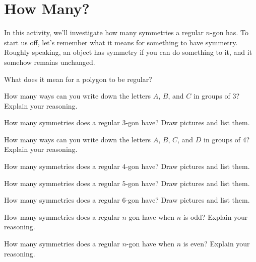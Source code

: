 \newpage
\section{How Many?} 
                                  

In this activity, we'll investigate how many symmetries a regular
$n$-gon has.  To start us off, let's remember what it means for
something to have symmetry. Roughly speaking, an object has symmetry
if you can do something to it, and it somehow remains unchanged.

\begin{prob}
What does it mean for a polygon to be regular?
\end{prob}

\begin{prob}
How many ways can you write down the letters $A$, $B$, and $C$ in
groups of 3? Explain your reasoning.
\end{prob}

\begin{prob}
How many symmetries does a regular $3$-gon have? Draw pictures and
list them.
\end{prob}

\begin{prob}
How many ways can you write down the letters $A$, $B$, $C$, and $D$ in
groups of 4? Explain your reasoning.
\end{prob}

\begin{prob}
How many symmetries does a regular $4$-gon have? Draw pictures and
list them.
\end{prob}

\begin{prob}
How many symmetries does a regular $5$-gon have? Draw pictures and
list them.
\end{prob}

\begin{prob}
How many symmetries does a regular $6$-gon have? Draw pictures and
list them.
\end{prob}

\begin{prob}
How many symmetries does a regular $n$-gon have when $n$ is odd?
Explain your reasoning.
\end{prob}

\begin{prob}
How many symmetries does a regular $n$-gon have when $n$ is even?
Explain your reasoning.
\end{prob}




